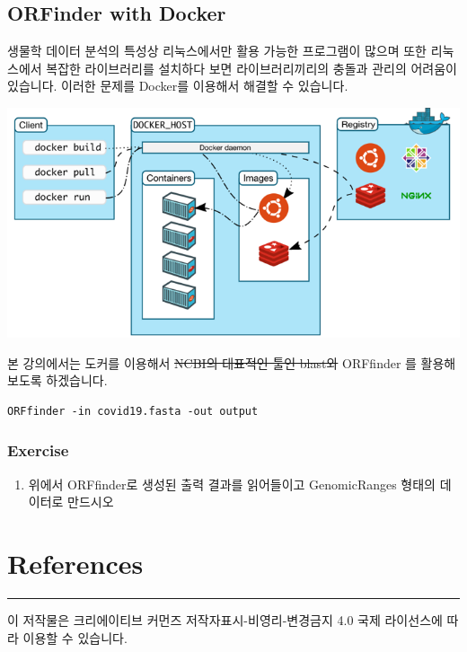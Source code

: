 \documentclass[
]{book}
\providecommand{\tightlist}{%
  \setlength{\itemsep}{0pt}\setlength{\parskip}{0pt}}
\begin{document}
\hypertarget{orfinder-with-docker}{%
\section{ORFinder with Docker}\label{orfinder-with-docker}}

생물학 데이터 분석의 특성상 리눅스에서만 활용 가능한 프로그램이 많으며 또한 리눅스에서 복잡한 라이브러리를 설치하다 보면 라이브러리끼리의 충돌과 관리의 어려움이 있습니다. 이러한 문제를 Docker를 이용해서 해결할 수 있습니다.

\includegraphics{docker.PNG}

본 강의에서는 도커를 이용해서 \sout{NCBI의 대표적인 툴인 blast와} ORFfinder 를 활용해보도록 하겠습니다.

\begin{verbatim}
ORFfinder -in covid19.fasta -out output
\end{verbatim}

\hypertarget{exercise-10}{%
\subsection{Exercise}\label{exercise-10}}

\begin{enumerate}
\def\labelenumi{\arabic{enumi}.}
\tightlist
\item
  위에서 ORFfinder로 생성된 출력 결과를 읽어들이고 GenomicRanges 형태의 데이터로 만드시오
\end{enumerate}

\hypertarget{references}{%
\chapter{References}\label{references}}

\begin{center}\rule{0.5\linewidth}{0.5pt}\end{center}

이 저작물은 크리에이티브 커먼즈 저작자표시-비영리-변경금지 4.0 국제 라이선스에 따라 이용할 수 있습니다.
\end{document}
